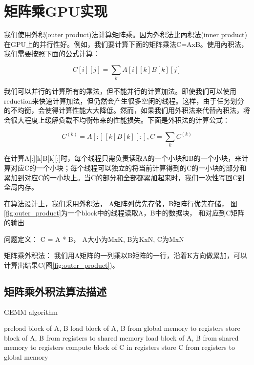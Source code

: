 \chapter{矩阵乘GPU实现}\label{chap:GEMMGPU}

我们使用外积(outer product)法计算矩阵乘。因为外积法比內积法(inner product)在GPU上的并行性好。例如，我们要计算下面的矩阵乘法C=AxB。使用內积法，我们需要按照下面的公式计算：

\begin{equation}
\label{eq:innerproduct}
C[i][j]=\sum_{k}A[i][k]B[k][j]
\end{equation}

我们可以并行的计算所有的乘法，但不能并行的计算加法。即使我们可以使用reduction来快速计算加法，但仍然会产生很多空闲的线程。这样，由于任务划分的不均衡，会使得计算性能大大降低。然而，如果我们用外积法来代替內积法，将会很大程度上缓解负载不均衡带来的性能损失。下面是外积法的计算公式：

\begin{equation}
\label{eq:outerproduct}
C^{(k)}=A[:][k]B[k][:], C=\sum_{k}C^{(k)}
\end{equation}

在计算A[:][k]B[k][:]时，每个线程只需负责读取A的一个小块和B的一个小块，来计算对应C的一个小块；每个线程可以独立的将当前计算得到的C的一小块的部分和累加到对应C的一小块上。当C的部分和全部都累加起来时，我们一次性写回C到全局内存。

在算法设计上，我们采用外积法， A矩阵列优先存储，B矩阵行优先存储， 图\ref{fig:outer_product}为一个block中的线程读取A，B中的数据块， 和对应到C矩阵的输出

问题定义： C = A * B， A大小为MxK, B为KxN, C为MxN 

矩阵乘外积法： 我们用A矩阵的一列乘以B矩阵的一行，沿着K方向做累加，可以计算出结果C(图\ref{fig:outer_product})。

\section{矩阵乘外积法算法描述}

\begin{algorithm}[htbp]
	\small
	\caption{GEMM algorithm}\label{alg:gemm}
	\begin{algorithmic}[1]
		\State preload block of A, B
		\State load block of A, B from global memory to registers
		\State store block of A, B from registers to shared memory
		\State load block of A, B from shared memory to registers
		\State compute block of C in registers
		\EndWhile\label{gemmendwhile}
		\State store C from registers to global memory
	\end{algorithmic}
\end{algorithm}



